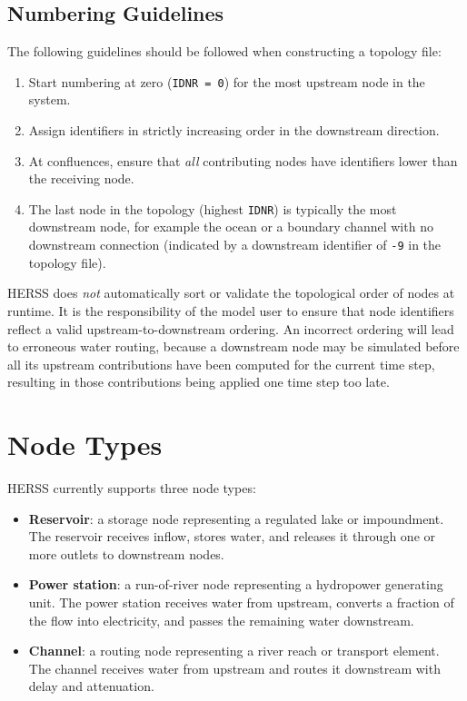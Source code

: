 \documentclass[a4paper, 12pt]{report}
\begin{document}
	\subsection*{Numbering Guidelines}
	
	The following guidelines should be followed when constructing a topology file:
	
	\begin{enumerate}
		\item Start numbering at zero (\texttt{IDNR = 0}) for the most upstream node in the system.
		\item Assign identifiers in strictly increasing order in the downstream direction.
		\item At confluences, ensure that \emph{all} contributing nodes have identifiers lower than the receiving node.
		\item The last node in the topology (highest \texttt{IDNR}) is typically the most downstream node, for example the ocean or a boundary channel with no downstream connection (indicated by a downstream identifier of \texttt{-9} in the topology file).
	\end{enumerate}
	
	HERSS does \emph{not} automatically sort or validate the topological order of nodes at runtime. It is the responsibility of the model user to ensure that node identifiers reflect a valid upstream-to-downstream ordering. An incorrect ordering will lead to erroneous water routing, because a downstream node may be simulated before all its upstream contributions have been computed for the current time step, resulting in those contributions being applied one time step too late.
	\newpage

	\section{Node Types}
	\label{sec:nodetypes}

	HERSS currently supports three node types:

	\begin{itemize}
		\item \textbf{Reservoir}: a storage node representing a regulated lake or impoundment. The reservoir receives inflow, stores water, and releases it through one or more outlets to downstream nodes.
		\item \textbf{Power station}: a run-of-river node representing a hydropower generating unit. The power station receives water from upstream, converts a fraction of the flow into electricity, and passes the remaining water downstream.
		\item \textbf{Channel}: a routing node representing a river reach or transport element. The channel receives water from upstream and routes it downstream with delay and attenuation.
	\end{itemize}
\end{document}
